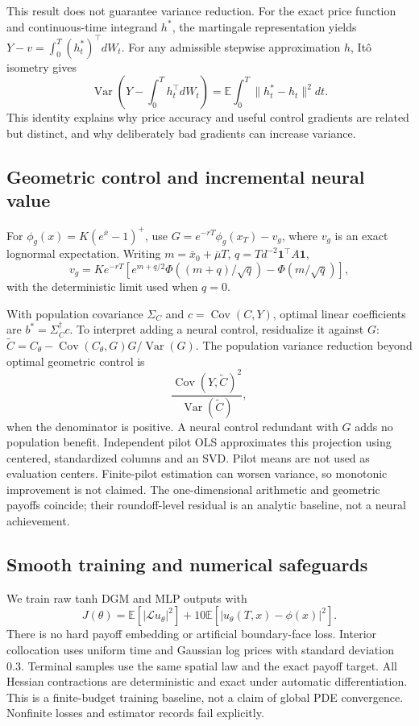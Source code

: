 \documentclass[10pt]{article}
\newcommand{\E}{\mathbb{E}}
\newcommand{\Var}{\operatorname{Var}}
\newcommand{\Cov}{\operatorname{Cov}}
\begin{document}
This result does not guarantee variance reduction. For the exact price function
and continuous-time integrand $h^*$, the martingale representation yields
$Y-v=\int_0^T(h_t^*)^\top dW_t$. For any admissible stepwise approximation
$h$, It\^o isometry gives
\begin{equation}
 \Var\left(Y-\int_0^Th_t^\top dW_t\right)
 =\E\int_0^T\|h_t^*-h_t\|^2dt.
\end{equation}
This identity explains why price accuracy and useful control gradients are
related but distinct, and why deliberately bad gradients can increase variance.

\subsection{Geometric control and incremental neural value}
For $\phi_g(x)=K(e^{\bar x}-1)^+$, use
$G=e^{-rT}\phi_g(x_T)-v_g$, where $v_g$ is an exact lognormal expectation.
Writing $m=\bar x_0+\bar\mu T$, $q=T d^{-2}\mathbf1^\top A\mathbf1$,
\begin{equation}
 v_g=Ke^{-rT}\left[e^{m+q/2}\Phi((m+q)/\sqrt q)
                          -\Phi(m/\sqrt q)\right],
\end{equation}
with the deterministic limit used when $q=0$.

With population covariance $\Sigma_C$ and $c=\Cov(C,Y)$, optimal linear
coefficients are $b^*=\Sigma_C^{\dagger}c$. To interpret adding a neural control,
residualize it against $G$: $\widetilde C=C_\theta-
\Cov(C_\theta,G)G/\Var(G)$. The population variance reduction beyond optimal
geometric control is
\begin{equation}\label{eq:incremental}
 \frac{\Cov(Y,\widetilde C)^2}{\Var(\widetilde C)},
\end{equation}
when the denominator is positive. A neural control redundant with $G$ adds no
population benefit. Independent pilot OLS approximates this projection using
centered, standardized columns and an SVD. Pilot means are not used as evaluation
centers. Finite-pilot estimation can worsen variance, so monotonic improvement
is not claimed. The one-dimensional arithmetic and geometric payoffs coincide;
their roundoff-level residual is an analytic baseline, not a neural achievement.

\subsection{Smooth training and numerical safeguards}
We train raw tanh DGM and MLP outputs with
\begin{equation}
 J(\theta)=\E[|\mathcal L u_\theta|^2]
       +10\E[|u_\theta(T,x)-\phi(x)|^2].
\end{equation}
There is no hard payoff embedding or artificial boundary-face loss. Interior
collocation uses uniform time and Gaussian log prices with standard deviation
0.3. Terminal samples use the same spatial law and the exact payoff target.
All Hessian contractions are deterministic and exact under automatic
differentiation. This is a finite-budget training baseline, not a claim of
global PDE convergence. Nonfinite losses and estimator records fail explicitly.
\end{document}
